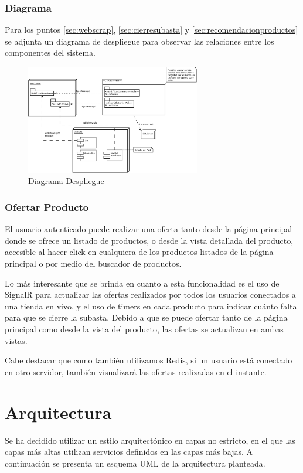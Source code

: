 \documentclass[journal]{IEEEtran}
\begin{document}
\subsubsection{Diagrama}
Para los puntos \ref{sec:webscrap}, \ref{sec:cierresubasta} y \ref{sec:recomendacionproductos} se adjunta un diagrama de despliegue para observar las relaciones entre los componentes del sistema.

\begin{figure}[]
  \centering
    \includegraphics[width=3in]{./figuras/despliegue.png}
  \caption{Diagrama Despliegue}
  \label{fig:despliegue}
\end{figure} 


\subsubsection{Ofertar Producto}
El usuario autenticado puede realizar una oferta tanto desde la página principal donde se ofrece un listado de productos, o desde la vista detallada del producto, accesible al hacer click en cualquiera de los productos listados de la página principal o por medio del buscador de productos.

Lo más interesante que se brinda en cuanto a esta funcionalidad es el uso de SignalR para actualizar las ofertas realizados por todos los usuarios conectados a una tienda en vivo, y el uso de timers en cada producto para indicar cuánto falta para que se cierre la subasta.
Debido a que se puede ofertar tanto de la página principal como desde la vista del producto, las ofertas se actualizan en ambas vistas.

Cabe destacar que como también utilizamos Redis, si un usuario está conectado en otro servidor, también visualizará las ofertas realizadas en el instante.

\section{Arquitectura}
Se ha decidido utilizar un estilo arquitectónico en capas no estricto, en el que las capas más altas utilizan servicios definidos en las capas más bajas.
A continuación se presenta un esquema UML de la arquitectura planteada.
\end{document}
